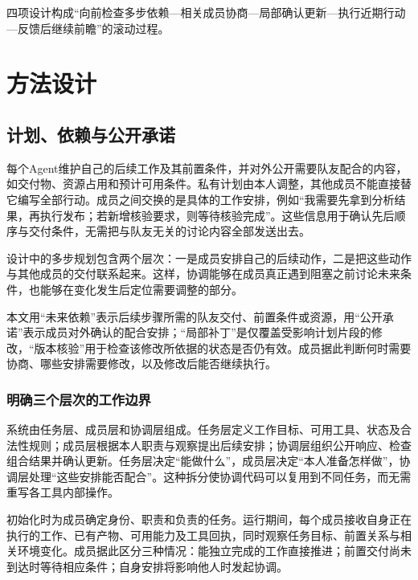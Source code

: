 四项设计构成“向前检查多步依赖—相关成员协商—局部确认更新—执行近期行动—反馈后继续前瞻”的滚动过程。

\hypertarget{ux65b9ux6cd5ux8bbeux8ba1}{%
\chapter{方法设计}\label{ux65b9ux6cd5ux8bbeux8ba1}}

\hypertarget{ux8ba1ux5212ux4f9dux8d56ux4e0eux516cux5f00ux627fux8bfa}{%
\section{计划、依赖与公开承诺}\label{ux8ba1ux5212ux4f9dux8d56ux4e0eux516cux5f00ux627fux8bfa}}

每个Agent维护自己的后续工作及其前置条件，并对外公开需要队友配合的内容，如交付物、资源占用和预计可用条件。私有计划由本人调整，其他成员不能直接替它编写全部行动。成员之间交换的是具体的工作安排，例如``我需要先拿到分析结果，再执行发布；若新增核验要求，则等待核验完成''。这些信息用于确认先后顺序与交付条件，无需把与队友无关的讨论内容全部发送出去。

设计中的多步规划包含两个层次：一是成员安排自己的后续动作，二是把这些动作与其他成员的交付联系起来。这样，协调能够在成员真正遇到阻塞之前讨论未来条件，也能够在变化发生后定位需要调整的部分。

本文用“未来依赖”表示后续步骤所需的队友交付、前置条件或资源，用“公开承诺”表示成员对外确认的配合安排；“局部补丁”是仅覆盖受影响计划片段的修改，“版本核验”用于检查该修改所依据的状态是否仍有效。成员据此判断何时需要协商、哪些安排需要修改，以及修改后能否继续执行。

\subsection{明确三个层次的工作边界}

系统由任务层、成员层和协调层组成。任务层定义工作目标、可用工具、状态及合法性规则；成员层根据本人职责与观察提出后续安排；协调层组织公开响应、检查组合结果并确认更新。任务层决定“能做什么”，成员层决定“本人准备怎样做”，协调层处理“这些安排能否配合”。这种拆分使协调代码可以复用到不同任务，而无需重写各工具内部操作。

初始化时为成员确定身份、职责和负责的任务。运行期间，每个成员接收自身正在执行的工作、已有产物、可用能力及工具回执，同时观察任务目标、前置关系与相关环境变化。成员据此区分三种情况：能独立完成的工作直接推进；前置交付尚未到达时等待相应条件；自身安排将影响他人时发起协调。

